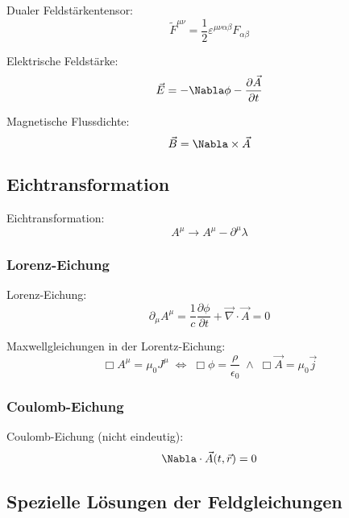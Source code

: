 \documentclass[11pt]{article}
\numberwithin{equation}{section}
\begin{document}
			\noindent
			Dualer Feldstärkentensor:
			\begin{equation}
				\tilde{F}^{\mu\nu} = \frac{1}{2}\varepsilon^{\mu\nu\alpha\beta}F_{\alpha\beta}
			\end{equation}

			\noindent
			Elektrische Feldstärke:
			\begin{equation}
				\vec{E} = -\Nabla\phi-\pder{\vec{A}}{t}
			\end{equation}

			\noindent
			Magnetische Flussdichte:
			\begin{equation}
				\vec{B} = \Nabla\times\vec{A}
			\end{equation}

		\subsection{Eichtransformation}
			\noindent
			Eichtransformation:
			\begin{equation}
				A^\mu \rightarrow A^\mu-\partial^\mu \lambda
			\end{equation}

			\subsubsection{Lorenz-Eichung}
				\noindent
				Lorenz-Eichung:
				\begin{equation}
					\partial_\mu A^\mu = \frac{1}{c}\frac{\partial \phi}{\partial t} + \vec{\nabla}\cdot\vec{A} = 0
				\end{equation}

				\noindent
				Maxwellgleichungen in der Lorentz-Eichung:
				\begin{equation}
					\Box A^\mu = \mu_0 J^\mu \;\Leftrightarrow\;
					\Box \phi = \dfrac{\rho}{\epsilon_0} \;\wedge\;
					\Box \vec{A} = \mu_0 \vec{j}
				\end{equation}

			\subsubsection{Coulomb-Eichung}
				\noindent
				Coulomb-Eichung (nicht eindeutig):
				\begin{equation}
					\Nabla\cdot\vec{A}(t,\vec{r})=0
				\end{equation}

		\subsection{Spezielle Lösungen der Feldgleichungen}
\end{document}
